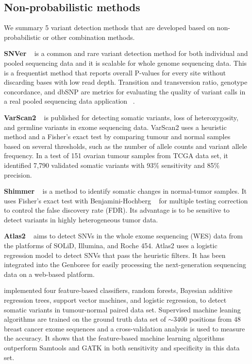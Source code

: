 \documentclass[11pt,reqno]{amsart}
\begin{document}
\subsection{Non-probabilistic methods}
We summary 5 variant detection methods that are developed based on non-probabilistic or other combination methods.

\textbf{SNVer} ~\citep{Wei2011} is a common and rare variant detection method for both individual and pooled sequencing data and it is scalable for whole genome sequencing data.
This is a frequentist method that reports overall P-values for every site without discarding bases with low read depth.
Transition and transversion ratio, genotype concordance, and dbSNP are metrics for evaluating the quality of variant calls in a real pooled sequencing data application ~\citep{depristo2011framework}.

\textbf{VarScan2} ~\citep{Koboldt2012} is published for detecting somatic variants, loss of heterozygosity, and germline variants in exome sequencing data.
VarScan2 uses a heuristic method and a Fisher's exact test by comparing tumour and normal samples based on several thresholds, such as the number of allele counts and variant allele frequency.
In a test of 151 ovarian tumour samples from TCGA data set, it identified 7,790 validated somatic variants with 93\% sensitivity and 85\% precision.

\textbf{Shimmer} ~\citep{Hansen2013} is a method to identify somatic changes in normal-tumor samples.
It uses Fisher's exact test with Benjamini-Hochberg ~\citep{benjamini1995controlling} for multiple testing correction to control the false discovery rate (FDR).
Its advantage is to be sensitive to detect variants in highly heterogeneous tumor data.

\textbf{Atlas2} ~\citep{challis2012integrative} aims to detect SNVs in the whole exome sequencing (WES) data from the platforms of SOLiD, Illumina, and Roche 454.
Atlas2 uses a logistic regression model to detect SNVs that pass the heuristic filters.
It has been integrated into the Genboree for easily processing the next-generation sequencing data on a web-based platform.


\citet{Ding2012} implemented four feature-based classifiers, random forests, Bayesian additive regression trees, support vector machines, and logistic regression, to detect somatic variants in tumour-normal paired data set.
Supervised machine leaning algorithms are trained on the ground truth data set of $\sim 3400$ positions from $48$ breast cancer exome sequences and a cross-validation analysis is used to measure the accuracy.
It shows that the feature-based machine learning algorithms outperform Samtools and GATK in both sensitivity and specificity in this data set.
\end{document}

